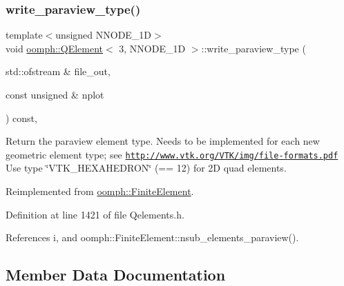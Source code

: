 \subsubsection{\texorpdfstring{write\+\_\+paraview\+\_\+type()}{write\_paraview\_type()}}
{\footnotesize\ttfamily template$<$unsigned N\+N\+O\+D\+E\+\_\+1D$>$ \\
void \hyperlink{classoomph_1_1QElement}{oomph\+::\+Q\+Element}$<$ 3, N\+N\+O\+D\+E\+\_\+1D $>$\+::write\+\_\+paraview\+\_\+type (\begin{DoxyParamCaption}\item[{std\+::ofstream \&}]{file\+\_\+out,  }\item[{const unsigned \&}]{nplot }\end{DoxyParamCaption}) const\hspace{0.3cm}{\ttfamily [inline]}, {\ttfamily [virtual]}}



Return the paraview element type. Needs to be implemented for each new geometric element type; see \href{http://www.vtk.org/VTK/img/file-formats.pdf}{\tt http\+://www.\+vtk.\+org/\+V\+T\+K/img/file-\/formats.\+pdf} Use type \char`\"{}\+V\+T\+K\+\_\+\+H\+E\+X\+A\+H\+E\+D\+R\+O\+N\char`\"{} (== 12) for 2D quad elements. 



Reimplemented from \hyperlink{classoomph_1_1FiniteElement_a68f0f8dc76f04e7d69983ec711b4ab08}{oomph\+::\+Finite\+Element}.



Definition at line 1421 of file Qelements.\+h.



References i, and oomph\+::\+Finite\+Element\+::nsub\+\_\+elements\+\_\+paraview().



\subsection{Member Data Documentation}
\mbox{\label{classoomph_1_1QElement_3_013_00_01NNODE__1D_01_4_adfd6bf6124a73f57866d79ff85839bac}} 
